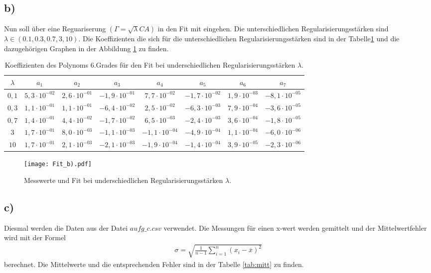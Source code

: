 \subsection{b)}
\label{subsec:a1b}
Nun soll über eine Reguariserung $(\Gamma=\sqrt{\lambda}CA)$ in den Fit mit
eingehen.
Die unterschiedlichen Regularisierungsstärken sind
 $\lambda \in (0.1,0.3,0.7,3,10)$.
Die Koeffizienten die sich für die unterschiedlichen
Regularisierungsstärken sind in der Tabelle\ref{tab:b} und
die dazugehörigen Graphen in der Abbildung \ref{fig:b} zu finden.
\begin{table}
  \caption{Koeffizienten des Polynoms 6.Grades für den Fit bei underschiedlichen Regularisierungsstärken $\lambda$.}
  \label{tab:b}
  \begin{tabular}{ c c c c c c c c}
\toprule
  $\lambda$  & $a_1 $&$ a_2 $&$ a_3 $&$  a_4 $&$  a_5 $&$ a_6 $&$a_7$\\
\midrule
$0,1  $  & $5,3\cdot10^{-02}$&$ 2,6\cdot10^{-01} $&$ -1,9\cdot10^{-01} $&$ 7,7\cdot10^{-02} $&$-1,7\cdot10^{-02} $&$1,9\cdot10^{-03} $&$-8,1\cdot10^{-05}$\\
$0,3  $  & $1,1\cdot10^{-01}$&$ 1,1\cdot10^{-01} $&$ -6,4\cdot10^{-02} $&$ 2,5\cdot10^{-02} $&$-6,3\cdot10^{-03} $&$7,9\cdot10^{-04} $&$-3,6\cdot10^{-05}$\\
$0,7  $  & $1,4\cdot10^{-01}$&$ 4,4\cdot10^{-02} $&$ -1,7\cdot10^{-02} $&$ 6,5\cdot10^{-03} $&$-2,4\cdot10^{-03} $&$3,6\cdot10^{-04} $&$-1,8\cdot10^{-05}$\\
$3    $  & $1,7\cdot10^{-01}$&$ 8,0\cdot10^{-03} $&$ -1,1\cdot10^{-03} $&$-1,1\cdot10^{-04} $&$-4,9\cdot10^{-04} $&$1,1\cdot10^{-04} $&$-6,0\cdot10^{-06}$\\
$10   $  & $1,7\cdot10^{-01}$&$ 2,1\cdot10^{-03} $&$ -2,1\cdot10^{-03} $&$-1,9\cdot10^{-04} $&$-1,4\cdot10^{-04} $&$3,9\cdot10^{-05} $&$-2,3\cdot10^{-06}$\\
\bottomrule
  \end{tabular}
\end{table}


\begin{figure}
  \centering
  \texttt{[image: Fit\_b).pdf]}
  \caption{Messwerte und
   Fit bei underschiedlichen Regularisierungsstärken $\lambda$.}
  \label{fig:b}
\end{figure}



\FloatBarrier
\subsection{c)}
\label{subsec:a1c}
Diesmal werden die Daten aus der Datei $aufg\_c.csv$ verwendet.
Die Messungen für einen x-wert werden gemittelt und
der Mittelwertfehler wird mit der Formel
\begin{align}
  \sigma=\sqrt{\frac{1}{n-1}\sum_{i=1}^n(x_i-\overline{x})^2}
\end{align}
berechnet.
Die Mittelwerte und die entsprechenden Fehler sind in
der Tabelle \ref{tab:mitt} zu finden.

